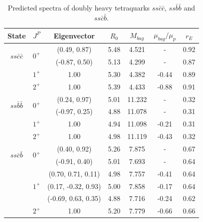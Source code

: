 \documentclass[prd,twocolumn,floatfix,nofootinbib]{revtex4}
\begin{document}
\renewcommand{\tabcolsep}{0.65cm} \renewcommand{\arraystretch}{1.2}
\begin{table}[!htb]
\caption{Predicted spectra of doubly heavy tetraquarks $ss\bar{c}\bar{c}$, $%
ss\bar{b}\bar{b}$ and $ss\bar{c}\bar{b}$. }
\label{tab:2heavytetraquark0}%
\begin{tabular}{ccccccc}
\hline\hline
\textrm{State} & $J^{P}$ & \textrm{Eigenvector} & $R_{0}$ & $M_{bag}$ & $%
\mu_{bag}/\mu_{p}$ & $r_{E}$ \\ \hline
\multirow{2}{*}{$ss\bar{c}\bar{c}$} & \multirow{2}{*}{$0^{+}$} & (0.49, 0.87)
& 5.48 & 4.521 & - & 0.92 \\
&  & (-0.87, 0.50) & 5.13 & 4.299 & - & 0.87 \\
& $1^{+}$ & 1.00 & 5.30 & 4.382 & -0.44 & 0.89 \\
& $2^{+}$ & 1.00 & 5.39 & 4.433 & -0.88 & 0.91 \\
\multirow{2}{*}{$ss\bar{b}\bar{b}$} & \multirow{2}{*}{$0^{+}$} & (0.24, 0.97)
& 5.01 & 11.232 & - & 0.32 \\
&  & (-0.97, 0.25) & 4.88 & 11.078 & - & 0.31 \\
& $1^{+}$ & 1.00 & 4.94 & 11.098 & -0.21 & 0.31 \\
& $2^{+}$ & 1.00 & 4.98 & 11.119 & -0.43 & 0.32 \\
\multirow{2}{*}{$ss\bar{c}\bar{b}$} & \multirow{2}{*}{$0^{+}$} & (0.40, 0.92)
& 5.26 & 7.875 & - & 0.67 \\
&  & (-0.91, 0.40) & 5.01 & 7.693 & - & 0.64 \\
& \multirow{3}{*}{$1^{+}$} & (0.70, 0.71, 0.11) & 4.98 & 7.757 & -0.41 & 0.64
\\
&  & (0.17, -0.32, 0.93) & 5.00 & 7.858 & -0.17 & 0.64 \\
&  & (-0.69, 0.63, 0.35) & 4.88 & 7.716 & -0.24 & 0.62 \\
& $2^{+}$ & 1.00 & 5.20 & 7.779 & -0.66 & 0.66 \\ \hline\hline
\end{tabular}%
\end{table}
\end{document}
